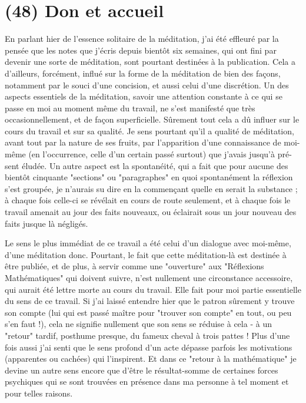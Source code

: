\section{(48) Don et accueil}

En parlant hier de l'essence solitaire de la méditation, j'ai été effleuré par la pensée que les notes que j’écris depuis bientôt six semaines, qui ont fini par devenir une sorte de méditation, sont pourtant destinées à la publication. Cela a d'ailleurs, forcément, influé sur la forme de la méditation de bien des façons, notamment par le souci d'une concision, et aussi celui d'une discrétion. Un des aspects essentiels de la méditation, savoir une attention constante à ce qui se passe en moi au moment même du travail, ne s'est manifesté que très occasionnellement, et de façon superficielle. Sûrement tout cela a dû influer sur le cours du travail et sur sa qualité. Je sens pourtant qu'il a qualité de méditation, avant tout par la nature de ses fruits, par l'apparition d'une connaissance de moi-même (en l'occurrence, celle d'un certain passé surtout) que j'avais jusqu'à pré- sent éludée. Un autre aspect est la spontanéité, qui a fait que pour aucune des bientôt cinquante "sections" ou "paragraphes" en quoi spontanément la réflexion s'est groupée, je n'aurais su dire en la commençant quelle en serait la substance ; à chaque fois celle-ci se révélait en cours de route seulement, et à chaque fois le travail amenait au jour des faits nouveaux, ou éclairait sous un jour nouveau des faits jusque là négligés.

Le sens le plus immédiat de ce travail a été celui d'un dialogue avec moi-même, d'une méditation donc. Pourtant, le fait que cette méditation-là est destinée à être publiée, et de plus, à servir comme une "ouverture" aux "Réflexions Mathématiques" qui doivent suivre, n'est nullement une circonstance accessoire, qui aurait été lettre morte au cours du travail. Elle fait pour moi partie essentielle du sens de ce travail. Si j’ai laissé entendre hier que le patron sûrement y trouve son compte (lui qui est passé maître pour "trouver son compte" en tout, ou peu s'en faut !), cela ne signifie nullement que son sens se réduise à cela - à un "retour" tardif, posthume presque, du fameux cheval à trois pattes ! Plus d'une fois aussi j'ai senti que le sens profond d'un acte dépasse parfois les motivations (apparentes ou cachées) qui l’inspirent. Et dans ce "retour à la mathématique" je devine un autre sens encore que d'être le résultat-somme de certaines forces psychiques qui se sont trouvées en présence dans ma personne à tel moment et pour telles raisons.

